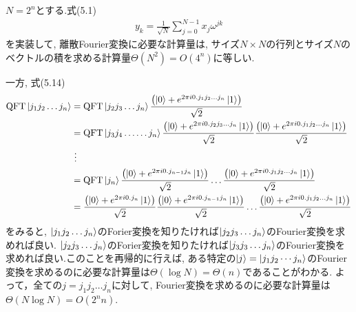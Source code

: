 \begin{ex}
    \label{ex5.3}
    $N = 2^n$とする.式(5.1)
    \begin{align*}
        y_k = \frac{1}{\sqrt{N}} \sum_{j=0}^{N-1} x_j \omega^{jk}
    \end{align*}
    を実装して, 離散Fourier変換に必要な計算量は, サイズ$N \times N$の行列とサイズ$N$のベクトルの積を求める計算量$\Theta(N^2) = O(4^n)$に等しい.
    \par
    一方, 式(5.14)
    \begin{align*}
        \mathrm{QFT} \ket{j_1 j_2 \dots j_n}
         & =
        \mathrm{QFT} \ket{j_2 j_3 \dots j_n}
        \frac{
            \left(\ket{0}  + e^{2\pi i 0.j_1 j_2 \dots j_n}  \ket{1}\right)
        }{\sqrt{2}}
        \\
         & =
        \mathrm{QFT} \ket{j_3 j_4 \dots \dots j_n}
        \frac{
            \left(\ket{0}  + e^{2\pi i 0.j_2 j_3 \dots j_n}  \ket{1}\right)
        }{\sqrt{2}}
        \frac{
            \left(\ket{0}  + e^{2\pi i 0.j_1 j_2 \dots j_n}  \ket{1}\right)
        }{\sqrt{2}}
        \\
         & \ \vdots
        \\
         & = \mathrm{QFT} \ket{j_n}
        \frac{
            \left(\ket{0}  + e^{2\pi i 0.j_{n-1} j_n}  \ket{1}\right)
        }{\sqrt{2}}
        \dots
        \frac{
            \left(\ket{0}  + e^{2\pi i 0.j_1 j_2 \dots j_n}  \ket{1}\right)
        }{\sqrt{2}}
        \\
         & =
        \frac{
            \left(\ket{0}  + e^{2\pi i 0. j_n}  \ket{1}\right)
        }{\sqrt{2}}
        \frac{
            \left(\ket{0}  + e^{2\pi i 0.j_{n-1} j_n}  \ket{1}\right)
        }{\sqrt{2}}
        \dots
        \frac{
            \left(\ket{0}  + e^{2\pi i 0.j_1 j_2 \dots j_n}  \ket{1}\right)
        }{\sqrt{2}}
    \end{align*}
    をみると, $\ket{j_1 j_2 \dots j_n}$のForier変換を知りたければ$\ket{j_2j_3 \dots j_n}$のFourier変換を求めれば良い. $\ket{j_2 j_3 \dots j_n}$のForier変換を知りたければ$\ket{j_3j_3 \dots j_n}$のFourier変換を求めれば良い.このことを再帰的に行えば,
    ある特定の$\ket{j} = \ket{j_1 j_2 \cdots j_n}$のFourier変換を求めるのに必要な計算量は$\Theta(\log N) = \Theta(n)$であることがわかる. よって，全ての$j = j_1 j_2 \dots j_n$に対して, Fourier変換を求めるのに必要な計算量は$\Theta(N \log N) = O(2^n n)$.
\end{ex}


